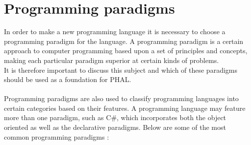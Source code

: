 \section{Programming paradigms}
In order to make a new programming language it is necessary to choose a programming paradigm for the language. 
A programming paradigm is a certain approach to computer programming based upon a set of principles and concepts, making each particular paradigm superior at certain kinds of problems.
\\
It is therefore important to discuss this subject and which of these paradigms should be used as a foundation for PHAL.
\\\\
Programming paradigms are also used to classify programming languages into certain categories based on their features. A programming language may feature more than one paradigm, such as C\#, which incorporates both the object oriented as well as the declarative paradigms. Below are some of the most common programming paradigms \cite{ProgrammingParadigmsKurtNormark}:
